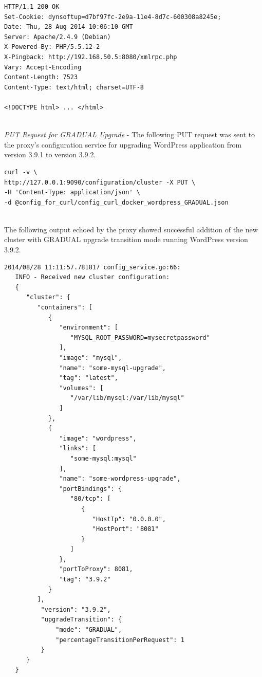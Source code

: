 \documentclass[a4paper,11pt,twoside]{report}
\begin{document}
\begin{lstlisting}[language=terminal]
HTTP/1.1 200 OK
Set-Cookie: dynsoftup=d7bf97fc-2e9a-11e4-8d7c-600308a8245e;
Date: Thu, 28 Aug 2014 10:06:10 GMT
Server: Apache/2.4.9 (Debian)
X-Powered-By: PHP/5.5.12-2
X-Pingback: http://192.168.50.5:8080/xmlrpc.php
Vary: Accept-Encoding
Content-Length: 7523
Content-Type: text/html; charset=UTF-8
 
<!DOCTYPE html> ... </html>
\end{lstlisting}

\noindent\\
\textit{PUT Request for GRADUAL Upgrade} - The following PUT request was sent to the proxy's configuration service for upgrading WordPress application from version 3.9.1 to version 3.9.2.\smallskip

\begin{lstlisting}[language=terminal]
curl -v \
http://127.0.0.1:9090/configuration/cluster -X PUT \
-H 'Content-Type: application/json' \ 
-d @config_for_curl/config_curl_docker_wordpress_GRADUAL.json
\end{lstlisting}
 
\noindent \\
The following output echoed by the proxy showed successful addition of the new cluster with GRADUAL upgrade transition mode running WordPress version 3.9.2. \smallskip

\begin{lstlisting}[language=terminal]
2014/08/28 11:11:57.781817 config_service.go:66:     
   INFO - Received new cluster configuration:
   {
      "cluster": {
         "containers": [
            {
               "environment": [
                  "MYSQL_ROOT_PASSWORD=mysecretpassword"
               ],
               "image": "mysql",
               "name": "some-mysql-upgrade",
               "tag": "latest",
               "volumes": [
                  "/var/lib/mysql:/var/lib/mysql"
               ]
            },
            {
               "image": "wordpress",
               "links": [
                  "some-mysql:mysql"
               ],
               "name": "some-wordpress-upgrade",
               "portBindings": {
                  "80/tcp": [
                     {
                        "HostIp": "0.0.0.0",
                        "HostPort": "8081"
                     }
                  ]
               },
               "portToProxy": 8081,
               "tag": "3.9.2"
            }
         ],
          "version": "3.9.2", 
          "upgradeTransition": {
              "mode": "GRADUAL", 
              "percentageTransitionPerRequest": 1
          }
      }
   }
\end{lstlisting}
\end{document}
